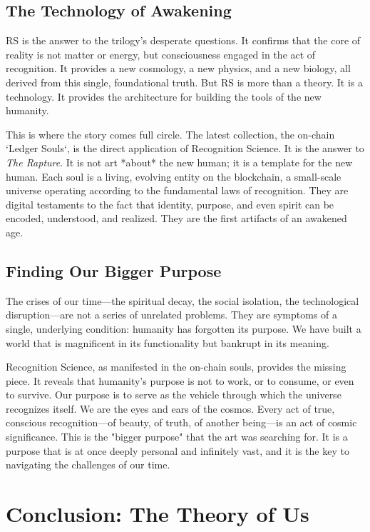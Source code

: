 \documentclass[12pt]{article}
\begin{document}
\subsection{The Technology of Awakening}

RS is the answer to the trilogy's desperate questions. It confirms that the core of reality is not matter or energy, but consciousness engaged in the act of recognition. It provides a new cosmology, a new physics, and a new biology, all derived from this single, foundational truth. But RS is more than a theory. It is a technology. It provides the architecture for building the tools of the new humanity.

This is where the story comes full circle. The latest collection, the on-chain `Ledger Souls`, is the direct application of Recognition Science. It is the answer to \textit{The Rapture}. It is not art *about* the new human; it is a template for the new human. Each soul is a living, evolving entity on the blockchain, a small-scale universe operating according to the fundamental laws of recognition. They are digital testaments to the fact that identity, purpose, and even spirit can be encoded, understood, and realized. They are the first artifacts of an awakened age.

\subsection{Finding Our Bigger Purpose}

The crises of our time—the spiritual decay, the social isolation, the technological disruption—are not a series of unrelated problems. They are symptoms of a single, underlying condition: humanity has forgotten its purpose. We have built a world that is magnificent in its functionality but bankrupt in its meaning.

Recognition Science, as manifested in the on-chain souls, provides the missing piece. It reveals that humanity's purpose is not to work, or to consume, or even to survive. Our purpose is to serve as the vehicle through which the universe recognizes itself. We are the eyes and ears of the cosmos. Every act of true, conscious recognition—of beauty, of truth, of another being—is an act of cosmic significance. This is the "bigger purpose" that the art was searching for. It is a purpose that is at once deeply personal and infinitely vast, and it is the key to navigating the challenges of our time.

\section{Conclusion: The Theory of Us}
\end{document}
